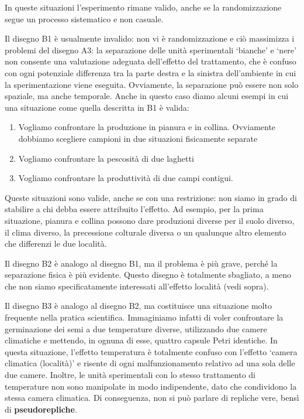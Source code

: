\documentclass[a4paper,12pt,oneside]{book}
\providecommand{\tightlist}{%
  \setlength{\itemsep}{0pt}\setlength{\parskip}{0pt}}
\theoremstyle{definition}
\theoremstyle{definition}
\theoremstyle{definition}
\theoremstyle{remark}
\begin{document}
In queste situazioni l'esperimento rimane valido, anche se la
randomizzazione segue un processo sistematico e non casuale.

Il disegno B1 è usualmente invalido: non vi è randomizzazione e ciò
massimizza i problemi del disegno A3: la separazione delle unità
sperimentali `bianche' e `nere' non consente una valutazione adeguata
dell'effetto del trattamento, che è confuso con ogni potenziale
differenza tra la parte destra e la sinistra dell'ambiente in cui la
sperimentazione viene eseguita. Ovviamente, la separazione può essere
non solo spaziale, ma anche temporale. Anche in questo caso diamo alcuni
esempi in cui una situazione come quella descritta in B1 è valida:

\begin{enumerate}
\def\labelenumi{\arabic{enumi}.}
\tightlist
\item
  Vogliamo confrontare la produzione in pianura e in collina. Ovviamente
  dobbiamo scegliere campioni in due situazioni fisicamente separate
\item
  Vogliamo confrontare la pescosità di due laghetti
\item
  Vogliamo confrontare la produttività di due campi contigui.
\end{enumerate}

Queste situazioni sono valide, anche se con una restrizione: non siamo
in grado di stabilire a chi debba essere attribuito l'effetto. Ad
esempio, per la prima situazione, pianura e collina possono dare
produzioni diverse per il suolo diverso, il clima diverso, la
precessione colturale diversa o un qualunque altro elemento che
differenzi le due località.

Il disegno B2 è analogo al disegno B1, ma il problema è più grave,
perché la separazione fisica è più evidente. Questo disegno è totalmente
sbagliato, a meno che non siamo specificatamente interessati all'effetto
località (vedi sopra).

Il disegno B3 è analogo al disegno B2, ma costituisce una situazione
molto frequente nella pratica scientifica. Immaginiamo infatti di voler
confrontare la germinazione dei semi a due temperature diverse,
utilizzando due camere climatiche e mettendo, in ognuna di esse, quattro
capsule Petri identiche. In questa situazione, l'effetto temperatura è
totalmente confuso con l'effetto `camera climatica (località)' e risente
di ogni malfunzionamento relativo ad una sola delle due camere. Inoltre,
le unità sperimentali con lo stesso trattamento di temperature non sono
manipolate in modo indipendente, dato che condividono la stessa camera
climatica. Di conseguenza, non si può parlare di repliche vere, bensì di
\textbf{pseudorepliche}.
\end{document}

